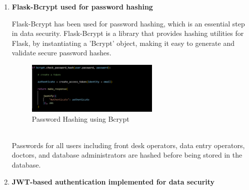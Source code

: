 \documentclass[12pt,a4paper]{article}
\begin{document}
{\begin{enumerate}
\begin{lstlisting}
@app.route('/patient/<int:ssn>/test', methods=['POST', 'GET'])
def patient_ssn_test(ssn):

@app.route('/physician', methods=['POST', 'GET'])
def physician():

@app.route('/physician/<int:id>')
def physician_id(id):

@app.route('/physician/engagements')
def physician_engagements()

@app.route('/procedure')
def procedure():

@app.route('/procedure/<int:id>', methods=['POST'])
def procedure_id(id)

@app.route('/medication')
def medication():

@app.route('/appointment/<int:id>', methods=['PATCH', 'GET'])
def appointment_id(id):

@app.route('/notify')
def notify():

@app.route('/stats')
def stats():


\end{lstlisting}

\\

\item \textbf{Flask-Bcrypt used for password hashing} 

Flask-Bcrypt has been used for password hashing, which is an essential step in data security. Flask-Bcrypt is a library that provides hashing utilities for Flask, by instantiating a 'Bcrypt' object, making it easy to generate and validate secure password hashes.
\begin{figure}[htp]
    \centering
    \includegraphics[width=0.6\textwidth]{routes.py - Sekhmet [WSL_ Ubuntu] - Visual Studio Code 12-03-2023 21_34_11.png}
    \caption{Password Hashing using Bcrypt}
\end{figure}

\\ Passwords for all users including front desk operators, data entry operators, doctors, and database administrators are hashed before being stored in the database.
\\
\item \textbf{JWT-based authentication implemented for data security} 


\end{enumerate}}
\end{document}
